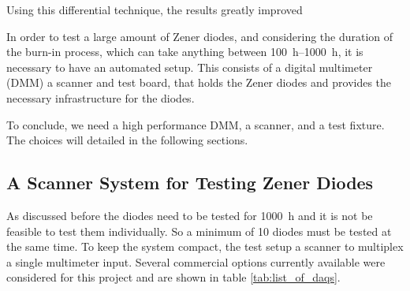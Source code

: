 Using this differential technique, the results greatly improved

In order to test a large amount of Zener diodes, and considering the duration of the burn-in process, which can take anything between \qtyrange{100}{1000}{\hour}, it is necessary to have an automated setup. This consists of a digital multimeter (DMM) a scanner and test board, that holds the Zener diodes and provides the necessary infrastructure for the diodes.



To conclude, we need a high performance DMM, a scanner, and a test fixture. The choices will detailed in the following sections.



\subsection{A Scanner System for Testing Zener Diodes}
As discussed before the diodes need to be tested for \qty{1000}{\hour} and it is not be feasible to test them individually. So a minimum of 10 diodes must be tested at the same time. To keep the system compact, the test setup a scanner to multiplex a single multimeter input. Several commercial options currently available were considered for this project and are shown in table \ref{tab:list_of_daqs}.

